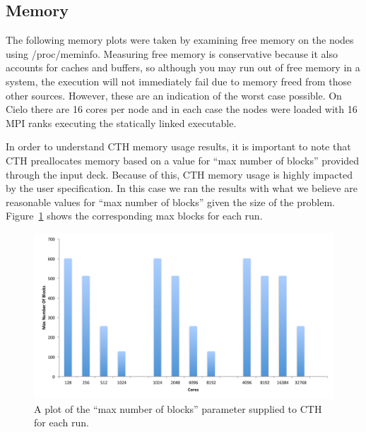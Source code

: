 



\subsection{Memory}
The following memory plots were taken by examining free memory on the nodes
using /proc/meminfo.  Measuring free memory is conservative because it also
accounts for caches and buffers, so although you may run out of free memory in
a system, the execution will not immediately fail due to memory freed from
those other sources.  However, these are an indication of the worst case
possible.  On Cielo there are 16 cores per node and in each case the nodes were
 loaded with 16 MPI ranks executing the statically linked executable.  

In order to understand CTH memory usage results, it is important to note that
CTH preallocates memory based on a value for ``max number of blocks'' provided
through the input deck.  Because of this, CTH memory usage is highly impacted
by the user specification.  In this case we ran the results with what we
believe are reasonable values for ``max number of blocks'' given the size of the
problem.  Figure~\ref{fig:MaxBlocks} shows the corresponding max blocks for
each run.

\begin{figure}[htb]
  \centering
  \includegraphics[width=\linewidth]{figures/MaxNumberOfBlocks}
  \caption{A plot of the ``max number of blocks'' parameter supplied to CTH for each run.}
  \label{fig:MaxBlocks}
\end{figure}

